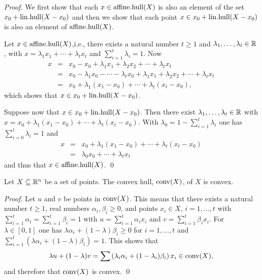 \begin{proof}
  We first show that each $x \in \mathrm{affine.hull}(X)$ is also an element of the
  set $ x_0 + \mathrm{lin.hull}(X-x_0)$ and then we show that each point $x \in
  x_0 + \mathrm{lin.hull}(X-x_0)$ is also an element of $\mathrm{affine.hull}(X)$.


  Let $x \in \mathrm{affine.hull}(X)$,i.e., there exists a natural number $t\geq1$
  and $\lambda_1,\ldots,\lambda_t \in \mathbb{R}$, with $x = \lambda_1x_1+\cdots+\lambda_t x_t$ and
  $\sum_{i=1}^t\lambda_i=1$. Now
  \begin{eqnarray*}
    x & = &  x_0  - x_0 + \lambda_1 x_1+   \lambda_2x_2+\cdots+\lambda_t x_t \\
    & = & x_0  - \lambda_1x_0 -  \cdots-\lambda_t x_0 + \lambda_1 x_1+  \lambda_2x_2+\cdots+\lambda_t x_t \\
    & = & x_0 +\lambda_1(x_1-x_0)+\cdots+\lambda_t (x_t-x_0),
  \end{eqnarray*}
  which shows that $x \in x_0 + \mathrm{lin.hull}(X - x_0)$. 


  Suppose now that
  $x \in x_0 + \mathrm{lin.hull}(X - x_0)$. Then there exist $\lambda_1,\ldots,\lambda_t\in \mathbb{R}$
  with $x = x_0 +\lambda_1(x_1-x_0)+\cdots+\lambda_t (x_t-x_0)$. With $\lambda_0 = 1
  -\sum_{i=1}^t \lambda_i$ one has $\sum_{i=0}^t \lambda_i =1$ and
  \begin{eqnarray*}
    x & = &  x_0 +\lambda_1(x_1-x_0)+\cdots+\lambda_t (x_t-x_0)\\
    & = & \lambda_0 x_0 + \cdots + \lambda_t x_t
  \end{eqnarray*}
  and thus that $x \in \mathrm{affine.hull}(X)$.  \qed 

\end{proof}






\begin{theorem}
  \label{conv:thr:1}
  Let $X\subseteq\mathbb{R}^n$ be a set of points. The convex hull, $\operatorname{conv}(X)$,  of $X$
  is convex. 
\end{theorem}

\begin{proof}
  Let $u$ and $v$ be points in $\operatorname{conv}(X)$. This means that there exists
  a natural number $t\geq1$,  real numbers  $\alpha_i,\beta_i\geq0$, and points $x_i
  \in X$,  $i=1,\ldots,t$ with
  $\sum_{i=1}^t \alpha_i = \sum_{i=1}^t \beta_i =1$ with  $u =  \sum_{i=1}^t
  \alpha_ix_i$  and $v = \sum_{i=1}^t \beta_ix_i$. For $\lambda \in [0,1]$ one has 
  $\lambda\alpha_i+(1-\lambda)\beta_i\geq0$ for $i=1,\ldots,t$  and $\sum_{i=1}^t
  \left(\lambda\alpha_i+(1-\lambda)\beta_i \right) =1$. This shows that   
  \begin{displaymath}
    \lambda u + (1-\lambda) v  =  \sum \left(\lambda_i \alpha_i + (1- \lambda_i) \beta_i\right)
    x_i  \in \operatorname{conv}(X),
  \end{displaymath}
  and therefore that $\operatorname{conv}(X)$ is convex. 
\qed \end{proof}

